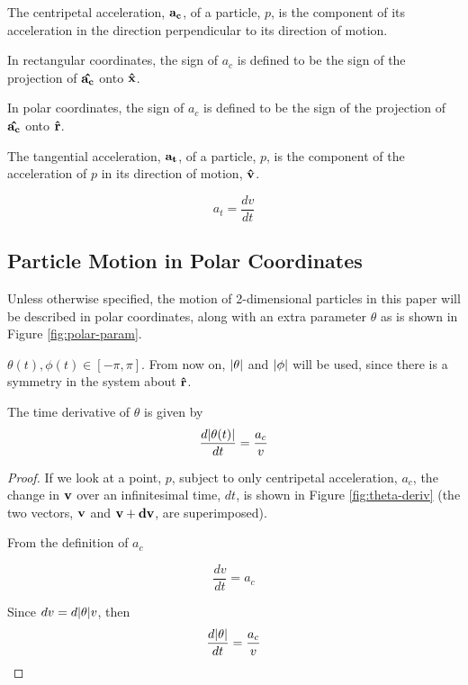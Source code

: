 \begin{definition}
  The centripetal acceleration, $\mathbf{a_c}$, of a particle, $p$, is the component of its acceleration in the direction perpendicular to its direction of motion.

  In rectangular coordinates, the sign of $a_c$ is defined to be the sign of the projection of $\mathbf{\hat{a_c}}$ onto $\mathbf{\hat{x}}$. 

  In polar coordinates, the sign of $a_c$ is defined to be the sign of the projection of $\mathbf{\hat{a_c}}$ onto $\mathbf{\hat{r}}$.
\end{definition}

\begin{definition}
  The tangential acceleration, $\mathbf{a_t}$, of a particle, $p$, is the component of the acceleration of $p$ in its direction of motion, $\mathbf{\hat{v}}$.

  \[
  a_t = \frac{dv}{dt}
  \]
\end{definition}


\subsection{Particle Motion in Polar Coordinates}

Unless otherwise specified, the motion of 2-dimensional particles in this paper will be described in polar coordinates, along with an extra parameter $\theta$ as is shown in Figure \ref{fig:polar-param}.


$\theta(t), \phi(t) \in [-\pi, \pi]$. From now on, $\abs{\theta}$ and $\abs{\phi}$ will be used, since there is a symmetry in the system about $\mathbf{\hat{r}}$.

\begin{lemma}
The time derivative of $\theta$ is given by
\[
\frac{d\abs{\theta(t)}}{dt} = \frac{a_c}{v}
\]
\end{lemma}

\begin{proof}

If we look at a point, $p$, subject to only centripetal acceleration, $a_c$, the change in $\mathbf{v}$ over an infinitesimal time, $dt$, is shown in Figure \ref{fig:theta-deriv} (the two vectors, $\mathbf{v}$ and $\mathbf{v}+\mathbf{dv}$, are superimposed). 


From the definition of $a_c$

\[
\frac{dv}{dt} = a_c
\]

Since $dv = d\abs{\theta} v$, then
\[
\frac{d\abs{\theta}}{dt} = \frac{a_c}{v}
\]
\end{proof}

